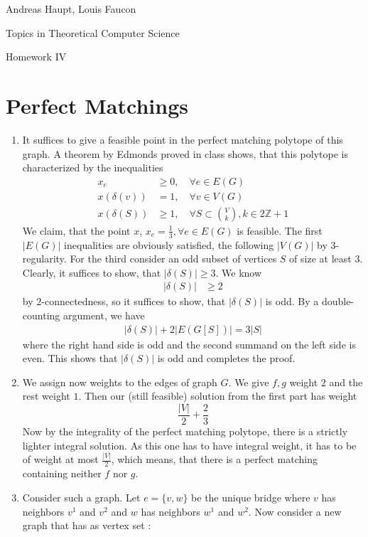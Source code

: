 \documentclass{scrartcl}
\newcommand\1{\mathbf{1}}
\begin{document}
Andreas Haupt, Louis Faucon

Topics in Theoretical Computer Science 

Homework IV


\section{Perfect Matchings}
\begin{enumerate}
\item
It suffices to give a feasible point in the perfect matching polytope of this graph. A theorem by Edmonds proved in class shows, that this polytope is characterized by the inequalities
\begin{align*}
x_e &\ge 0 , \quad \forall e \in E (G) \\
x(\delta (v)) &=1, \quad \forall v \in V(G) \\
x (\delta (S)) &\ge 1, \quad \forall S \subset \binom{V}{k}, k \in 2\mathbb{Z}+1
\end{align*}
We claim, that the point $x$, $x_e = \frac{1}{3}, \forall e \in E(G)$ is feasible. The first $\lvert E(G)\rvert$ inequalities are obviously satisfied, the following $\lvert V(G)\rvert$ by $3$-regularity. For the third consider an odd subset of vertices $S$ of size at least $3$. Clearly, it suffices to show, that $\lvert \delta (S) \rvert \ge 3$. We know
\begin{align*}
\lvert\delta (S)\rvert &\ge 2
\end{align*}
by $2$-connectedness, so it suffices to show, that $\lvert \delta (S) \rvert$ is odd. By a double-counting argument, we have
\begin{align*}
\lvert \delta (S) \rvert + 2\lvert E(G[S])\rvert = 3 \lvert S \rvert
\end{align*}
where the right hand side is odd and the second summand on the left side is even. This shows that $\lvert \delta (S) \rvert$ is odd and completes the proof.
\item
We assign now weights to the edges of graph $G$. We give $f,g$ weight $2$ and the rest weight $1$. Then our (still feasible) solution from the first part has weight
\[
\frac{\lvert V\rvert}{2} + \frac{2}{3}
\]
Now by the integrality of the perfect matching polytope, there is a strictly lighter integral solution. As this one has to have integral weight, it has to be of weight at most $\frac{\lvert V \rvert}{2}$, which means, that there is a perfect matching containing neither $f$ nor $g$.
\item
Consider such a graph. Let $e=\{v,w\}$ be the unique bridge where $v$ has neighbors $v^1$ and $v^2$ and $w$ has neighbors $w^1$ and $w^2$. Now consider a new graph that has as vertex set : 

\end{enumerate}
\end{document}
